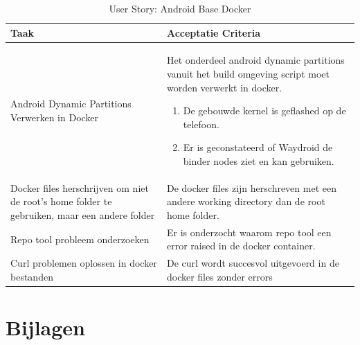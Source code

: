 \documentclass[a4paper]{report}
\newcommand{\userstorycolor}{PeachPuff1}
\begin{document}
  \begin{tcolorbox}[colback=white, coltitle=black, colframe=\userstorycolor, title=\textbf{User Story: }Als developer wil ik het stuk "Sourcing and Building relevant bits of your chosen Android base" verwerken in de Docker container\, om een stap dichter bij een makkelijkere werkomgeving te realiseren.]
    \begin{table}[H]
        \centering
      \begin{tabularx}{1\textwidth}{|X|X|}
        \hline
        \cellcolor[HTML]{ffcc99} \textbf{Taak} & \cellcolor[HTML]{ffcc99} \textbf{Acceptatie Criteria} \\ 
        \hline
        Android Dynamic Partitions Verwerken in Docker & Het onderdeel android dynamic partitions vanuit het build omgeving script moet worden verwerkt in docker. \begin{enumerate}[leftmargin=.4cm, topsep=0cm, itemsep=.2cm]
          \item De gebouwde kernel is geflashed op de telefoon.
          \item Er is geconstateerd of Waydroid de binder nodes ziet en kan gebruiken.
        \end{enumerate}\\ 
        \hline
        Docker files herschrijven om niet de root's home folder te gebruiken, maar een andere folder & De docker files zijn herschreven met een andere working directory dan de root home folder. \\ 
        \hline 
        Repo tool probleem onderzoeken & Er is onderzocht waarom repo tool een error raised in de docker container. \\
        \hline 
        Curl problemen oplossen in docker bestanden & De curl wordt succesvol uitgevoerd in de docker files zonder errors \\ 
        \hline 
      \end{tabularx}
      \caption{User Story: Android Base Docker}
    \label{table:it8:story_docker}
    \end{table}
    \end{tcolorbox}

\chapter{Bijlagen}
\end{document}
